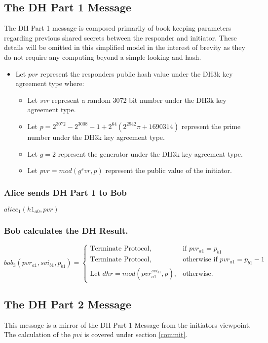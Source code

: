 \documentclass[11pt]{article}
\begin{document}
  \subsection{The DH Part 1 Message}
  The DH Part 1 message is composed primarily of book keeping parameters
  regarding previous shared secrets between the responder and initiator. These
  details will be omitted in this simplified model in the interest of brevity as
  they do not require any computing beyond a simple looking and hash.
  \begin{itemize}
    \item Let $pvr$ represent the responders public hash value under the DH3k
      key agreement type where:
      \begin{itemize}
        \item Let $svr$ represent a random 3072 bit number under the DH3k key
              agreement type.
        \item Let $p = 2^{3072} - 2^3008 - 1 + 2^64(2^2942\pi + 1690314)$ represent
              the prime number under the DH3k key agreement type.
        \item Let $g = 2$ represent the generator under the DH3k key agreement
              type.
        \item Let $pvr = mod(g^svr, p)$ represent the public value of the
              initiator.
      \end{itemize}
  \end{itemize}
  \subsubsection{Alice sends DH Part 1 to Bob}
  $alice_1(h1_{a0},pvr)$

  \subsubsection{Bob calculates the DH Result.}
  \[
    bob_3(pvr_{a1},svi_{b1},p_{b1})=
    \begin{cases}
      \text{Terminate Protocol}, &\text{if } pvr_{a1} = p_{b1} \\
      \text{Terminate Protocol}, &\text{otherwise if } pvr_{a1} = p_{b1} - 1 \\
      \text{Let $dhr = mod(pvr_{a1}^{svi_{b1}},p)$}, &\text{otherwise.}
    \end{cases}
  \]
  \subsection{The DH Part 2 Message}
  This message is a mirror of the DH Part 1 Message from the initiators
  viewpoint. The calculation of the $pvi$ is covered under section
  \ref{commit}.
\end{document}
